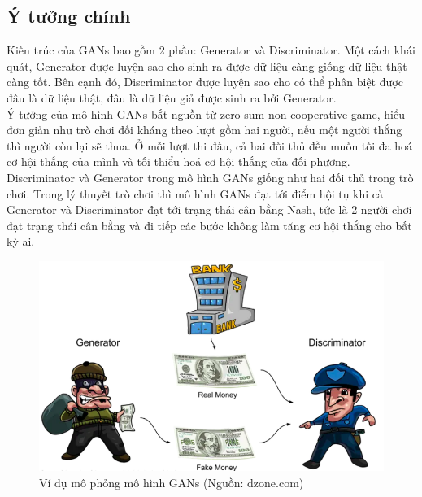 {    \subsection{Ý tưởng chính}
    Kiến trúc của GANs bao gồm 2 phần: Generator và Discriminator. Một cách khái quát, Generator được luyện sao cho sinh ra được dữ liệu càng giống dữ liệu thật càng tốt. Bên cạnh đó, Discriminator được luyện sao cho có thể phân biệt được đâu là dữ liệu thật, đâu là dữ liệu giả được sinh ra bởi Generator.\\
    Ý tưởng của mô hình GANs bắt nguồn từ zero-sum non-cooperative game, hiểu đơn giản như trò chơi đối kháng theo lượt gồm hai người, nếu một người thắng thì người còn lại sẽ thua. Ở mỗi lượt thi đấu, cả hai đối thủ đều muốn tối đa hoá cơ hội thắng của mình và tối thiểu hoá cơ hội thắng của đối phương. Discriminator và Generator trong mô hình GANs giống như hai đối thủ trong trò chơi. Trong lý thuyết trò chơi thì mô hình GANs đạt tới điểm hội tụ khi cả Generator và Discriminator đạt tới trạng thái cân bằng Nash, tức là 2 người chơi đạt trạng thái cân bằng và đi tiếp các bước không làm tăng cơ hội thắng cho bất kỳ ai.

    \begin{figure}[H]
    \centering
    \includegraphics[width=12cm] {images/gans_example.png}
    \caption{Ví dụ mô phỏng mô hình GANs (Nguồn: dzone.com)}
    \label{fig:gans_example}
    \end{figure}
    
}
